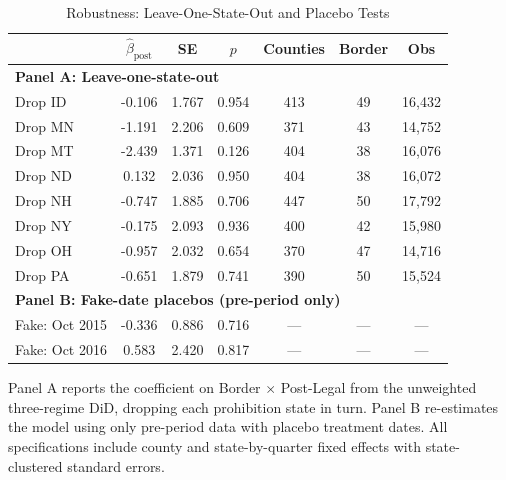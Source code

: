 \begin{table}[htbp]
\centering
\caption{Robustness: Leave-One-State-Out and Placebo Tests}
\label{tab:robustness}
\begin{tabular}{lcccccc}
\hline\hline
 & $\hat{\beta}_{\text{post}}$ & SE & $p$ & Counties & Border & Obs \\
\hline
\multicolumn{7}{l}{\textbf{Panel A: Leave-one-state-out}} \\
Drop ID & -0.106 & 1.767 & 0.954 & 413 & 49 & 16,432 \\
Drop MN & -1.191 & 2.206 & 0.609 & 371 & 43 & 14,752 \\
Drop MT & -2.439 & 1.371 & 0.126 & 404 & 38 & 16,076 \\
Drop ND & 0.132 & 2.036 & 0.950 & 404 & 38 & 16,072 \\
Drop NH & -0.747 & 1.885 & 0.706 & 447 & 50 & 17,792 \\
Drop NY & -0.175 & 2.093 & 0.936 & 400 & 42 & 15,980 \\
Drop OH & -0.957 & 2.032 & 0.654 & 370 & 47 & 14,716 \\
Drop PA & -0.651 & 1.879 & 0.741 & 390 & 50 & 15,524 \\
\hline
\multicolumn{7}{l}{\textbf{Panel B: Fake-date placebos (pre-period only)}} \\
Fake: Oct 2015 & -0.336 & 0.886 & 0.716 & --- & --- & --- \\
Fake: Oct 2016 & 0.583 & 2.420 & 0.817 & --- & --- & --- \\
\hline\hline
\end{tabular}
\begin{tablenotes}[flushleft]
\small
\item Panel A reports the coefficient on Border $\times$ Post-Legal from the unweighted three-regime DiD, dropping each prohibition state in turn. Panel B re-estimates the model using only pre-period data with placebo treatment dates. All specifications include county and state-by-quarter fixed effects with state-clustered standard errors.
\end{tablenotes}
\end{table}

